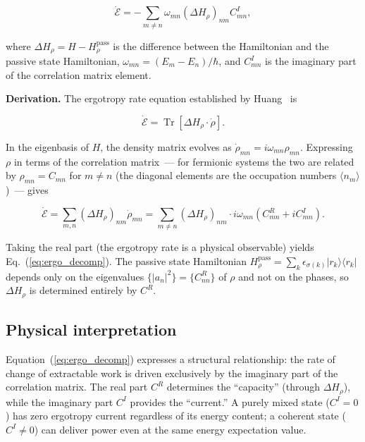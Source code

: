 \documentclass[aps,pra,preprint,groupedaddress,amsmath,amssymb,floatfix]{revtex4-2}
\begin{document}
\begin{equation}
\boxed{\dot{\mathcal{E}} = -\sum_{m\neq n} \omega_{mn} (\Delta H_\rho)_{nm} C^I_{mn}},
\label{eq:ergo_decomp}
\end{equation}

where $\Delta H_\rho = H - H_\rho^{\text{pass}}$ is the difference between the Hamiltonian and the passive state Hamiltonian, $\omega_{mn} = (E_m - E_n)/\hbar$, and $C^I_{mn}$ is the imaginary part of the correlation matrix element.

\textbf{Derivation.} The ergotropy rate equation established by Huang~\cite{huang2026} is

\begin{equation}
\dot{\mathcal{E}} = \operatorname{Tr}[\Delta H_\rho \cdot \dot{\rho}].
\label{eq:ergo_rate_Huang}
\end{equation}

In the eigenbasis of $H$, the density matrix evolves as $\dot{\rho}_{mn} = i\omega_{mn} \rho_{mn}$. Expressing $\rho$ in terms of the correlation matrix~--- for fermionic systems the two are related by $\rho_{mn} = C_{mn}$ for $m \neq n$ (the diagonal elements are the occupation numbers $\langle n_m \rangle$)~--- gives

\begin{equation}
\dot{\mathcal{E}} = \sum_{m,n} (\Delta H_\rho)_{nm} \dot{\rho}_{mn}
= \sum_{m\neq n} (\Delta H_\rho)_{nm} \cdot i\omega_{mn}(C^R_{mn} + i C^I_{mn}).
\label{eq:ergo_expand}
\end{equation}

Taking the real part (the ergotropy rate is a physical observable) yields Eq.~(\ref{eq:ergo_decomp}). The passive state Hamiltonian $H_\rho^{\text{pass}} = \sum_k \epsilon_{\sigma(k)} |r_k\rangle\langle r_k|$ depends only on the eigenvalues $\{|a_n|^2\} = \{C^R_{nn}\}$ of $\rho$ and not on the phases, so $\Delta H_\rho$ is determined entirely by $C^R$.

\subsection{Physical interpretation}
\label{sec:th2_interpretation}

Equation~(\ref{eq:ergo_decomp}) expresses a structural relationship: the rate of change of extractable work is driven exclusively by the imaginary part of the correlation matrix. The real part $C^R$ determines the ``capacity'' (through $\Delta H_\rho$), while the imaginary part $C^I$ provides the ``current.'' A purely mixed state ($C^I = 0$) has zero ergotropy current regardless of its energy content; a coherent state ($C^I \neq 0$) can deliver power even at the same energy expectation value.
\end{document}
